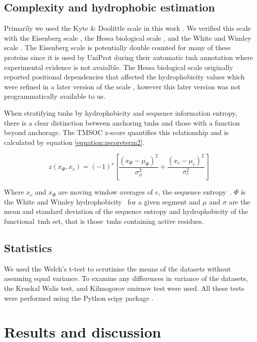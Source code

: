 \subsection{Complexity and hydrophobic estimation}
Primarily we used the Kyte \& Doolittle scale in this work \cite{Kyte1982}.
We verified this scale with the Eisenberg scale \cite{Eisenberg1984}, the Hessa biological scale \cite{Hessa2005}, and the White and Wimley scale \cite{White1999}.
The Eisenberg scale is potentially double counted for many of these proteins since it is used by UniProt during their automatic \gls{tmh} annotation where experimental evidence is not avaialble.
The Hessa biological scale originally reported positional dependencies that affected the hydrophobicity values which were refined in a later version of the scale \cite{Hessa2007}, however this later version was not programmatically available to us.

When stratifying \gls{tmh}s by hydrophobicity and sequence information entropy, there is a clear distinction between anchoring \gls{tmh}s and those with a function beyond anchorage.
The TMSOC z-score quantifies this relationship and is calculated by equation \ref{equation:zscoreterm2}.

\begin{equation} \label{zscoreterm2}
z({x}_{\Phi},{x}_{c})={(-1)}^{s}\left[\frac{{({x}_{\Phi}-{\mu}_{\Phi})}^{2}}{{\sigma}_{\phi}^{2}}+\frac{{({x}_{c}-{\mu}_{c})}^{2}}{{\sigma}_{c}^{2}}\right]
\end{equation}

Where $x_c$ and $x_\Phi$ are moving window averages of c, the sequence entropy~\cite{Wootton1996}. $\Phi$ is the White and Wimley hydrophobicity~\cite{White1999} for a given segment and $\mu$ and $\sigma$ are the mean and standard deviation of the sequence entropy and hydrophobicity of the functional~\gls{tmh} set, that is those~\gls{tmh}s containing active residues.

\subsection{Statistics}

We used the Welch's t\--test to scrutinise the means of the datasets without assuming equal variance.
To examine any differences in variance of the datasets, the Kruskal Walis test, and Kilmogorov smirnov test were used.
All these tests were performed using the Python scipy package \cite{Oliphant2007}.


\section{Results and discussion}

